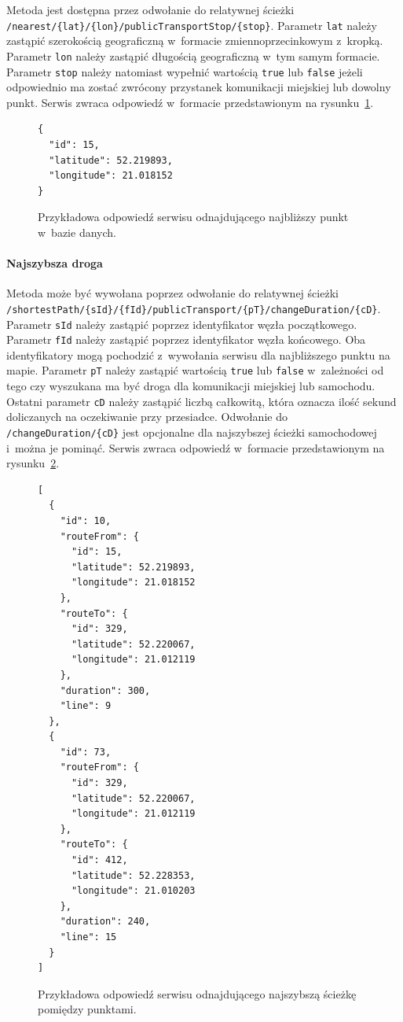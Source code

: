 \documentclass[a4paper,12pt]{article}
\begin{document}
	Metoda jest dostępna przez odwołanie do relatywnej ścieżki \Verb+/nearest/{lat}/{lon}/publicTransportStop/{stop}+. Parametr \Verb+lat+ należy zastąpić szerokością geograficzną w~formacie zmiennoprzecinkowym z~kropką. Parametr \Verb+lon+ należy zastąpić długością geograficzną w~tym samym formacie. Parametr \Verb+stop+ należy natomiast wypełnić wartością \Verb+true+ lub \Verb+false+ jeżeli odpowiednio ma zostać zwrócony przystanek komunikacji miejskiej lub dowolny punkt. Serwis zwraca odpowiedź w~formacie przedstawionym na rysunku~\ref{vrb:entry_service_response}.

	\begin{figure}[ht!]
		\centering
		\begin{BVerbatim}
{
  "id": 15,
  "latitude": 52.219893,
  "longitude": 21.018152
}
		\end{BVerbatim}
		\caption{Przykładowa odpowiedź serwisu odnajdującego najbliższy punkt w~bazie danych.}
		\label{vrb:entry_service_response}
	\end{figure}	

	\paragraph{Najszybsza droga}

	Metoda może być wywołana poprzez odwołanie do relatywnej ścieżki \Verb+/shortestPath/{sId}/{fId}/publicTransport/{pT}/changeDuration/{cD}+. Parametr \Verb+sId+ należy zastąpić poprzez identyfikator węzła początkowego. Parametr \Verb+fId+ należy zastąpić poprzez identyfikator węzła końcowego. Oba identyfikatory mogą pochodzić z~wywołania serwisu dla najbliższego punktu na mapie. Parametr \Verb+pT+ należy zastąpić wartością \Verb+true+ lub \Verb+false+ w~zależności od tego czy wyszukana ma być droga dla komunikacji miejskiej lub samochodu. Ostatni parametr \Verb+cD+ należy zastąpić liczbą całkowitą, która oznacza ilość sekund doliczanych na oczekiwanie przy przesiadce. Odwołanie do \Verb+/changeDuration/{cD}+ jest opcjonalne dla najszybszej ścieżki samochodowej i~można je pominąć. Serwis zwraca odpowiedź w~formacie przedstawionym na rysunku~\ref{vrb:route_service_response}.

	\begin{figure}[ht!]
		\centering
		\begin{BVerbatim}
[
  {
    "id": 10,
    "routeFrom": {
      "id": 15,
      "latitude": 52.219893,
      "longitude": 21.018152
    },
    "routeTo": {
      "id": 329,
      "latitude": 52.220067,
      "longitude": 21.012119
    },
    "duration": 300,
    "line": 9
  },
  {
    "id": 73,
    "routeFrom": {
      "id": 329,
      "latitude": 52.220067,
      "longitude": 21.012119
    },
    "routeTo": {
      "id": 412,
      "latitude": 52.228353,
      "longitude": 21.010203
    },
    "duration": 240,
    "line": 15
  }
]
		\end{BVerbatim}
		\caption{Przykładowa odpowiedź serwisu odnajdującego najszybszą ścieżkę pomiędzy punktami.}
		\label{vrb:route_service_response}
	\end{figure}	
\end{document}
